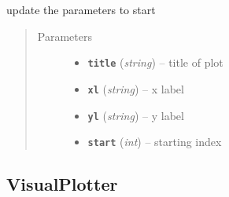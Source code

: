\documentclass[letterpaper,10pt,english]{sphinxmanual}
\begin{document}
\begin{fulllineitems}
\begin{fulllineitems}
\label{PopPlot:Visualplotterwidget.PopPlot.update_init}
update the parameters to start
\begin{quote}\begin{description}
\item[{Parameters}] \leavevmode\begin{itemize}
\item {} 
\textbf{\texttt{title}} (\emph{string}) -- title of plot

\item {} 
\textbf{\texttt{xl}} (\emph{string}) -- x label

\item {} 
\textbf{\texttt{yl}} (\emph{string}) -- y label

\item {} 
\textbf{\texttt{start}} (\emph{int}) -- starting index

\end{itemize}

\end{description}\end{quote}

\end{fulllineitems}


\end{fulllineitems}



\subsection{VisualPlotter}
\label{VisualPlotter::doc}\label{VisualPlotter:visualplotter}
\end{document}
